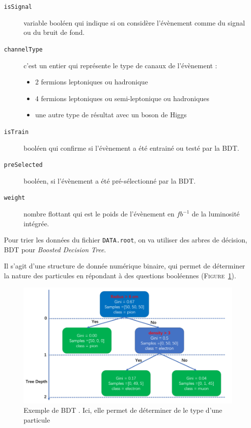 \documentclass[10pt,a4paper]{report}
\begin{document}
\begin{description}

	\item[\texttt{isSignal}] variable booléen qui indique si on considère l'évènement comme du signal ou du bruit de fond.
	
	\item[\texttt{channelType}] c'est un entier qui représente le type de canaux de l'évènement :
	\begin{itemize}
		\item 2 fermions leptoniques ou hadronique 
		\item 4 fermions leptoniques ou semi-leptonique ou hadroniques 
		\item une autre type de résultat avec un boson de Higgs
	\end{itemize}
	
	\item[\texttt{isTrain}] booléen qui confirme si l'évènement a été entrainé ou testé par la BDT.
	
	\item[\texttt{preSelected}] booléen, si l'évènement a été pré-sélectionné par la BDT.
	
	\item[\texttt{weight}] nombre flottant qui est le poids de l'évènement en $fb^{-1}$ de la luminosité intégrée.
	
\end{description}

Pour trier les données du fichier \texttt{DATA.root}, on va utiliser des arbres de décision, BDT pour \textit{Boosted Decision Tree}. 

Il s'agit d'une structure de donnée numérique binaire, qui permet de déterminer la nature des particules en répondant à des questions booléennes (\textsc{Figure}~\ref{ExampleBDT}).

\begin{figure}[h!]
	\center
	\includegraphics[width=\textwidth]{../img/ExampleBDT.png}
	\caption{Exemple de BDT \cite{liu:tel-03405418}. Ici, elle permet de déterminer de le type d'une particule}
	\label{ExampleBDT}
\end{figure}
\end{document}
